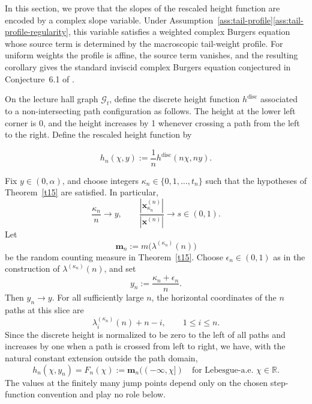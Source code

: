 \documentclass[11pt]{amsart}
\theoremstyle{plain}
\numberwithin{equation}{section}
\numberwithin{theorem}{section}
\numberwithin{figure}{section}
\begin{document}
In this section, we prove that the slopes of the rescaled height
function are encoded by a complex slope variable. Under
Assumption~\ref{ass:tail-profile}\ref{ass:tail-profile-regularity}, this variable satisfies a weighted
complex Burgers equation whose source term is determined by the
macroscopic tail-weight profile. For uniform weights the profile is
affine, the source term vanishes, and the resulting corollary gives the
standard inviscid complex Burgers equation conjectured in
Conjecture~6.1 of \cite{SKN21}.

On the lecture hall graph $\mathcal{G}_t$, define  the discrete height function $h^{\mathrm{disc}}$ associated to a  non-intersecting path configuration as follows. The height at the lower left corner is 0, and the height increases by 1 whenever crossing a path from the left to the right. Define the rescaled height function by 
 
  \begin{equation}
    h_n(\chi,y)
    :=
    \frac{1}{n}h^{\mathrm{disc}}(n\chi,ny).
    \label{eq:rescaled-height}
\end{equation}




\begingroup
Fix \(y\in(0,\alpha)\), and choose integers
\(\kappa_n\in\{0,1,\ldots,t_n\}\) such that the hypotheses of
Theorem~\ref{t15} are satisfied. In particular,
\[
    \frac{\kappa_n}{n}\longrightarrow y,
    \qquad
    \frac{|\mathbf x_{\kappa_n}^{(n)}|}
         {|\mathbf x^{(n)}|}
    \longrightarrow s\in(0,1).
\]
Let
\[
    \mathbf m_n
    :=
    m\bigl(\lambda^{(\kappa_n)}(n)\bigr)
\]
be the random counting measure in Theorem~\ref{t15}. Choose
\(\epsilon_n\in(0,1)\) as in the construction of
\(\lambda^{(\kappa_n)}(n)\), and set
\[
    y_n:=\frac{\kappa_n+\epsilon_n}{n}.
\]
Then \(y_n\to y\). For all sufficiently large \(n\), the horizontal
coordinates of the \(n\) paths at this slice are
\[
    \lambda_i^{(\kappa_n)}(n)+n-i,
    \qquad 1\leq i\leq n.
\]
Since the discrete height is normalized to be zero to the left of all
paths and increases by one when a path is crossed from left to right,
we have, with the natural constant extension outside the path domain,
\begin{equation}
    h_n(\chi,y_n)
    =F_n(\chi)
    :=\mathbf m_n(({-}\infty,\chi])
    \quad\text{for Lebesgue-a.e. }\chi\in\mathbb R.
    \label{eq:height-as-cdf}
\end{equation}
The values at the finitely many jump points depend only on the chosen
step-function convention and play no role below.
\end{document}
